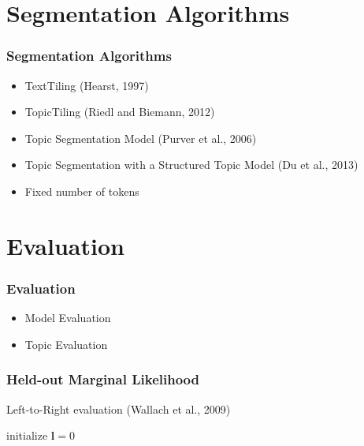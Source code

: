\documentclass{beamer}
\begin{document}
    \section{Segmentation Algorithms}

    \begin{frame}
        \frametitle{Segmentation Algorithms}
        \begin{itemize}
            \item TextTiling (Hearst, 1997)
            \item TopicTiling (Riedl and Biemann, 2012)
            \item Topic Segmentation Model (Purver et al., 2006)
            \item Topic Segmentation with a Structured Topic Model (Du et al., 2013)
            \item Fixed number of tokens
        \end{itemize}
    \end{frame}

    \section{Evaluation}

    \begin{frame}
        \frametitle{Evaluation}
        \begin{itemize}
            \item Model Evaluation
            \item Topic Evaluation
        \end{itemize}
    \end{frame}

    \begin{frame}
        \frametitle{Held-out Marginal Likelihood}
        Left-to-Right evaluation (Wallach et al., 2009)
        \newline

        \begin{algorithm}[H]
            initialize $\mathbf{l} = 0$ \\
        \end{algorithm}
    \end{frame}
\end{document}

